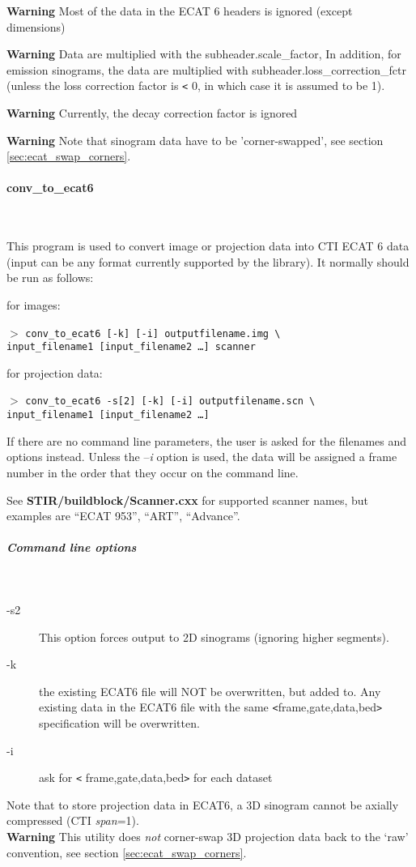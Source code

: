 \documentclass{article}
\newcommand{\subsubsubsection}[1]{\paragraph{#1}\mbox{} \\}
\newcommand{\subsubsubsubsection}[1]{\subparagraph{#1} \mbox{} \\}
\newcommand{\cmdline}[1]{\par \noindent $>$ \texttt{#1}\par}
\begin{document}
{{{\textbf{Warning} Most of the data in the ECAT 6 headers is ignored 
(except dimensions)


\textbf{Warning} Data are multiplied with the subheader.scale\_factor, 
In addition, for emission sinograms, the data are multiplied 
with subheader.loss\_correction\_fctr (unless the loss correction 
factor is \texttt{<} 0, in which case it is assumed to be 1).


\textbf{Warning} Currently, the decay correction factor is ignored 

\textbf{Warning} Note that sinogram data have to be 'corner-swapped', 
see section \ref{sec:ecat_swap_corners}.

{ \subsubsubsection{conv\_to\_ecat6}
}
This program is used to convert image or projection data into 
CTI ECAT 6 data (input can be any format currently supported 
by the library). It normally should be run as follows:


for images:
\cmdline{conv\_to\_ecat6 [-k] [-i] outputfilename.img {\textbackslash}\\
input\_filename1 [input\_filename2 \dots ] scanner}


for projection data:
\cmdline{conv\_to\_ecat6 -s[2] [-k] [-i] outputfilename.scn {\textbackslash}\\
input\_filename1 [input\_filename2 \dots ]}


If there are no command line parameters, the user is asked for 
the filenames and options instead. Unless the --\textit{i} option is 
used, the data will be assigned a frame number in the order that 
they occur on the command line.


See \textbf{STIR/buildblock/Scanner.cxx} for supported scanner names, 
but examples are ``ECAT 953'', ``ART'', 
``Advance''. 


{ \subsubsubsubsection{Command line options}
}\begin{description}
\item[-s2] This option forces output to 2D sinograms (ignoring higher 
segments).
\item[-k] the existing ECAT6 file will NOT be overwritten, but added 
to. Any existing data in the ECAT6 file with the same \texttt{<}frame,gate,data,bed\texttt{>} 
specification will be overwritten.
\item[-i] ask for \texttt{<} frame,gate,data,bed\texttt{>} for each dataset
\end{description}

Note that to store projection data in ECAT6, a 3D sinogram cannot 
be axially compressed (CTI \textit{span}=1).\\
\textbf{Warning} This utility does \textit{not} corner-swap 3D projection 
data back to the `raw' convention, see section \ref{sec:ecat_swap_corners}.

}}}
\end{document}
